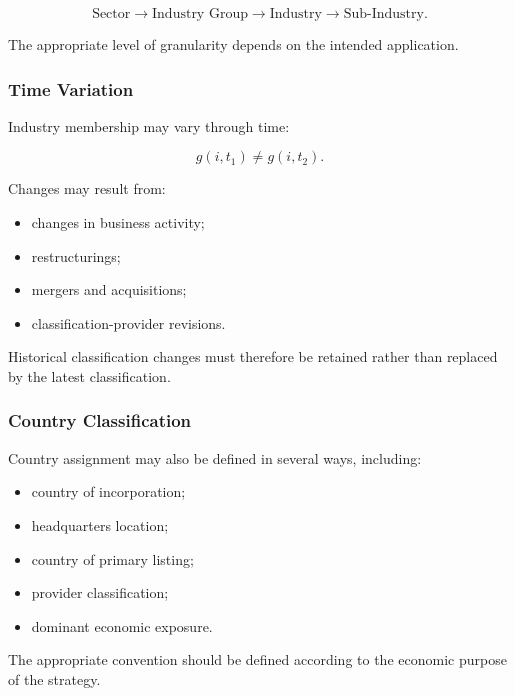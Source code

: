 \documentclass[11pt,a4paper]{article}
\begin{document}
\begin{equation}
\boxed{
\text{Sector}
\rightarrow
\text{Industry Group}
\rightarrow
\text{Industry}
\rightarrow
\text{Sub-Industry}.
}
\end{equation}

The appropriate level of granularity depends on the intended application.


\subsubsection{Time Variation}

Industry membership may vary through time:

\begin{equation}
g(i,t_1)
\neq
g(i,t_2).
\end{equation}

Changes may result from:

\begin{itemize}
    \item changes in business activity;
    \item restructurings;
    \item mergers and acquisitions;
    \item classification-provider revisions.
\end{itemize}

Historical classification changes must therefore be retained rather than
replaced by the latest classification.


\subsubsection{Country Classification}

Country assignment may also be defined in several ways, including:

\begin{itemize}
    \item country of incorporation;
    \item headquarters location;
    \item country of primary listing;
    \item provider classification;
    \item dominant economic exposure.
\end{itemize}

The appropriate convention should be defined according to the economic purpose
of the strategy.


\end{document}
